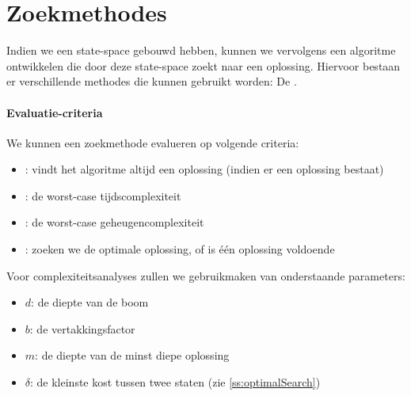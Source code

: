 \section{Zoekmethodes}
\label{s:searchMethods}
Indien we een state-space gebouwd hebben, kunnen we vervolgens een algoritme ontwikkelen die door deze state-space zoekt naar een oplossing. Hiervoor bestaan er verschillende methodes die kunnen gebruikt worden: De .
\paragraph{Evaluatie-criteria}
We kunnen een zoekmethode evalueren op volgende criteria:
\begin{itemize}
 \item {}: vindt het algoritme altijd een oplossing (indien er een oplossing bestaat)
 \item {}: de worst-case tijdscomplexiteit
 \item {}: de worst-case geheugencomplexiteit
 \item {}: zoeken we de optimale oplossing, of is \'e\'en oplossing voldoende
\end{itemize}
Voor complexiteitsanalyses zullen we gebruikmaken van onderstaande parameters:
\begin{itemize}
 \item $d$: de diepte van de boom
 \item $b$: de vertakkingsfactor
 \item $m$: de diepte van de minst diepe oplossing
 \item $\delta$: de kleinste kost tussen twee staten (zie \ref{ss:optimalSearch})
\end{itemize}
